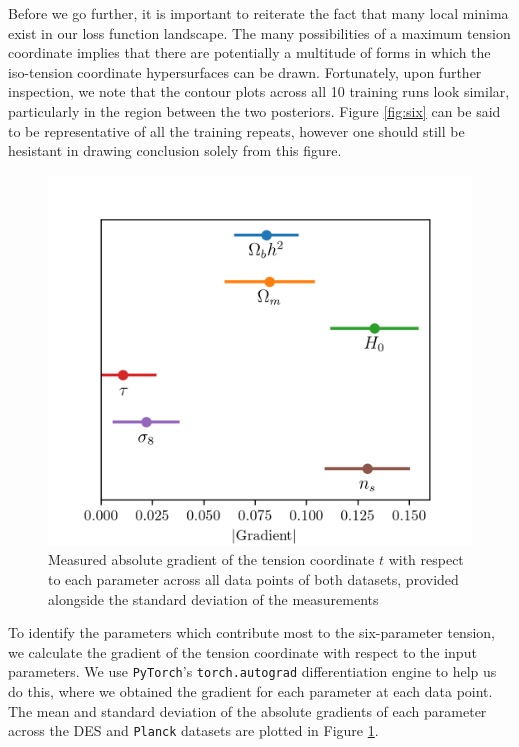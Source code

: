 \documentclass[%
 reprint,
 amsmath,amssymb,
 aps,
]{revtex4-2}
\begin{document}
Before we go further, it is important to reiterate the fact that many local minima exist in our loss function landscape. The many possibilities of a maximum tension coordinate implies that there are potentially a multitude of forms in which the iso-tension coordinate hypersurfaces can be drawn. Fortunately, upon further inspection, we note that the contour plots across all 10 training runs look similar, particularly in the region between the two posteriors. Figure \ref{fig:six} can be said to be representative of all the training repeats, however one should still be hesistant in drawing conclusion solely from this figure.

\begin{figure}
    \includegraphics[width=0.9\columnwidth]{../plots/grads.png}
    \centering
    \caption{Measured absolute gradient of the tension coordinate $t$ with respect to each parameter across all data points of both datasets, provided alongside the standard deviation of the measurements}
    \label{fig:grad}
\end{figure}

To identify the parameters which contribute most to the six-parameter tension, we calculate the gradient of the tension coordinate with respect to the input parameters. We use \texttt{PyTorch}'s \texttt{torch.autograd} differentiation engine to help us do this, where we obtained the gradient for each parameter at each data point. The mean and standard deviation of the absolute gradients of each parameter across the DES and \texttt{Planck} datasets are plotted in Figure \ref{fig:grad}.
\end{document}
